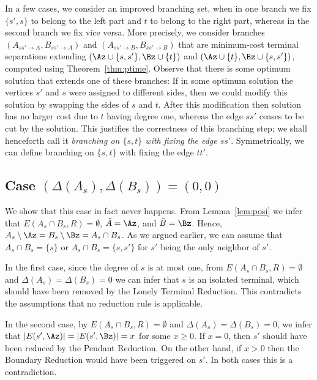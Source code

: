 In a few cases, we consider an improved branching set,
when in one branch we fix $\{s',s\}$ to belong to the left part and $t$ to belong to the right part, whereas in the second branch we fix vice versa. More precisely, we consider branches $(A_{ss'\to A},B_{ss'\to A})$ and $(A_{ss'\to B},B_{ss'\to B})$ that are minimum-cost terminal separations extending $(\Az\cup \{s,s'\},\Bz\cup \{t\})$ and $(\Az\cup \{t\},\Bz\cup \{s,s'\})$, computed using Theorem~\ref{thm:ptime}. Observe that there is some optimum solution that extends one of these branches: If in some optimum solution the vertices $s'$ and $s$ were assigned to different sides, then we could modify this solution by swapping the sides of $s$ and $t$. After this modification then solution has no larger cost due to $t$ having degree one, whereas the edge $ss'$ ceases to be cut by the solution. This justifies the correctness of this branching step; we shall henceforth call it {\em{branching on $\{s,t\}$ with fixing the edge $ss'$}}.
Symmetrically, we can define branching on $\{s,t\}$ with fixing the edge $tt'$.

\subsection{Case $(\Delta(A_s),\Delta(B_s))=(0,0)$}

We show that this case in fact never happens. From Lemma~\ref{lem:posi} we infer that $E(A_s \cap B_s, R) = \emptyset$, $\Atr=\Az$, and $\Btr=\Bz$. Hence, $A_s\setminus \Az=B_s\setminus \Bz=A_s\cap B_s$. As we argued earlier, we can assume that $A_s\cap B_s=\{s\}$ or $A_s\cap B_s=\{s,s'\}$ for $s'$ being the only neighbor of $s'$. 

In the first case, since the degree of $s$ is at most one, from $E(A_s \cap B_s, R) = \emptyset$ and $\Delta(A_s)=\Delta(B_s)=0$ we can infer that $s$ is an isolated terminal, which should have been removed by the Lonely Terminal Reduction. This contradicts the assumptions that no reduction rule is applicable.

In the second case, by $E(A_s \cap B_s, R) = \emptyset$ and $\Delta(A_s)=\Delta(B_s)=0$, we infer that $|E(s',\Az)|=|E(s',\Bz)|=x$ for some $x\geq 0$. If $x=0$, then $s'$ should have been reduced by the Pendant Reduction. On the other hand, if $x>0$ then the Boundary Reduction would have been triggered on $s'$. In both cases this is a contradiction.

